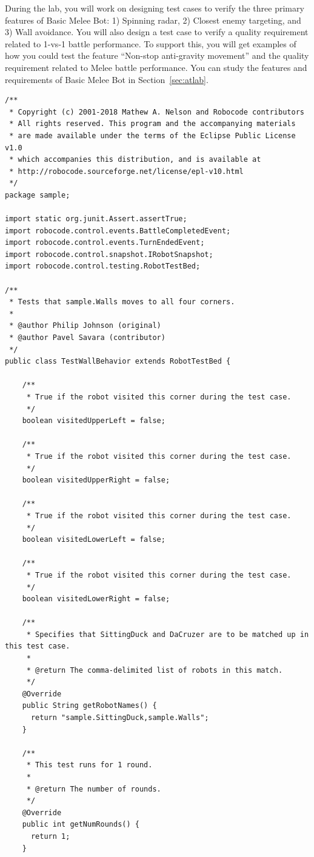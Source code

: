 \documentclass{scrreprt}
\begin{document}
During the lab, you will work on designing test cases to verify the three primary features of Basic Melee Bot: 1) Spinning radar, 2) Closest enemy targeting,  and 3) Wall avoidance. You will also design a test case to verify a quality requirement related to 1-vs-1 battle performance. To support this, you will get examples of how you could test the feature ``Non-stop anti-gravity movement'' and the quality requirement related to Melee battle performance. You can study the features and requirements of Basic Melee Bot in Section~\ref{sec:atlab}. 

\newpage
\begin{verbatim}
/**
 * Copyright (c) 2001-2018 Mathew A. Nelson and Robocode contributors
 * All rights reserved. This program and the accompanying materials
 * are made available under the terms of the Eclipse Public License v1.0
 * which accompanies this distribution, and is available at
 * http://robocode.sourceforge.net/license/epl-v10.html
 */
package sample;

import static org.junit.Assert.assertTrue;
import robocode.control.events.BattleCompletedEvent;
import robocode.control.events.TurnEndedEvent;
import robocode.control.snapshot.IRobotSnapshot;
import robocode.control.testing.RobotTestBed;

/**
 * Tests that sample.Walls moves to all four corners.
 *
 * @author Philip Johnson (original)
 * @author Pavel Savara (contributor)
 */
public class TestWallBehavior extends RobotTestBed {

	/**
	 * True if the robot visited this corner during the test case.
	 */
	boolean visitedUpperLeft = false;

	/**
	 * True if the robot visited this corner during the test case.
	 */
	boolean visitedUpperRight = false;

	/**
	 * True if the robot visited this corner during the test case.
	 */
	boolean visitedLowerLeft = false;

	/**
	 * True if the robot visited this corner during the test case.
	 */
	boolean visitedLowerRight = false;

	/**
	 * Specifies that SittingDuck and DaCruzer are to be matched up in this test case.
	 *
	 * @return The comma-delimited list of robots in this match.
	 */
	@Override
	public String getRobotNames() {
      return "sample.SittingDuck,sample.Walls";
	}

	/**
	 * This test runs for 1 round.
	 *
	 * @return The number of rounds.
	 */
	@Override
	public int getNumRounds() {
      return 1;
	}


\end{verbatim}
\end{document}
